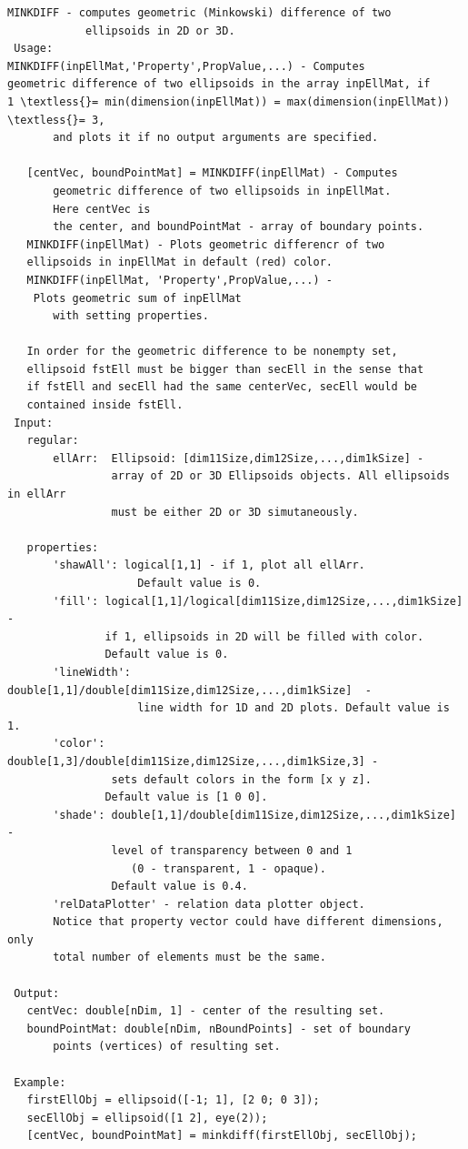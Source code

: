 \documentclass[letterpaper,10pt,english]{sphinxmanual}
\begin{document}
\begin{Verbatim}[commandchars=\\\{\}]
MINKDIFF - computes geometric (Minkowski) difference of two
            ellipsoids in 2D or 3D.
 Usage:
MINKDIFF(inpEllMat,'Property',PropValue,...) - Computes
geometric difference of two ellipsoids in the array inpEllMat, if
1 \textless{}= min(dimension(inpEllMat)) = max(dimension(inpEllMat)) \textless{}= 3,
       and plots it if no output arguments are specified.

   [centVec, boundPointMat] = MINKDIFF(inpEllMat) - Computes
       geometric difference of two ellipsoids in inpEllMat.
       Here centVec is
       the center, and boundPointMat - array of boundary points.
   MINKDIFF(inpEllMat) - Plots geometric differencr of two
   ellipsoids in inpEllMat in default (red) color.
   MINKDIFF(inpEllMat, 'Property',PropValue,...) -
    Plots geometric sum of inpEllMat
       with setting properties.

   In order for the geometric difference to be nonempty set,
   ellipsoid fstEll must be bigger than secEll in the sense that
   if fstEll and secEll had the same centerVec, secEll would be
   contained inside fstEll.
 Input:
   regular:
       ellArr:  Ellipsoid: [dim11Size,dim12Size,...,dim1kSize] -
                array of 2D or 3D Ellipsoids objects. All ellipsoids in ellArr
                must be either 2D or 3D simutaneously.

   properties:
       'shawAll': logical[1,1] - if 1, plot all ellArr.
                    Default value is 0.
       'fill': logical[1,1]/logical[dim11Size,dim12Size,...,dim1kSize]  -
               if 1, ellipsoids in 2D will be filled with color.
               Default value is 0.
       'lineWidth': double[1,1]/double[dim11Size,dim12Size,...,dim1kSize]  -
                    line width for 1D and 2D plots. Default value is 1.
       'color': double[1,3]/double[dim11Size,dim12Size,...,dim1kSize,3] -
                sets default colors in the form [x y z].
               Default value is [1 0 0].
       'shade': double[1,1]/double[dim11Size,dim12Size,...,dim1kSize]  -
                level of transparency between 0 and 1
                   (0 - transparent, 1 - opaque).
                Default value is 0.4.
       'relDataPlotter' - relation data plotter object.
       Notice that property vector could have different dimensions, only
       total number of elements must be the same.

 Output:
   centVec: double[nDim, 1] - center of the resulting set.
   boundPointMat: double[nDim, nBoundPoints] - set of boundary
       points (vertices) of resulting set.

 Example:
   firstEllObj = ellipsoid([-1; 1], [2 0; 0 3]);
   secEllObj = ellipsoid([1 2], eye(2));
   [centVec, boundPointMat] = minkdiff(firstEllObj, secEllObj);
\end{Verbatim}
\end{document}

